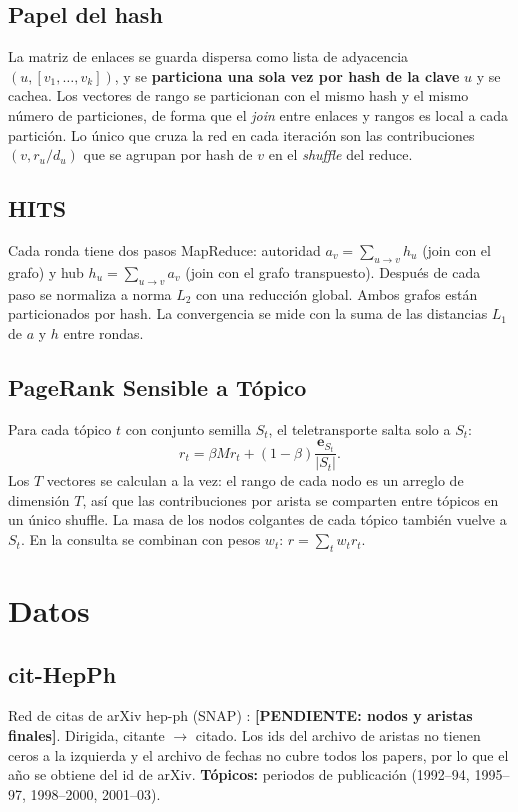\documentclass[11pt,a4paper]{article}
\newcommand{\pend}[1]{\textcolor{red!70!black}{\textbf{[PENDIENTE: #1]}}}
\begin{document}
\subsection{Papel del hash}
La matriz de enlaces se guarda dispersa como lista de adyacencia $(u,[v_1,\dots,v_k])$, y se \textbf{particiona una sola vez por hash de la clave} $u$ y se cachea. Los vectores de rango se particionan con el mismo hash y el mismo número de particiones, de forma que el \emph{join} entre enlaces y rangos es local a cada partición. Lo único que cruza la red en cada iteración son las contribuciones $(v, r_u/d_u)$ que se agrupan por hash de $v$ en el \emph{shuffle} del reduce.

\subsection{HITS}
Cada ronda tiene dos pasos MapReduce: autoridad $a_v=\sum_{u\to v}h_u$ (join con el grafo) y hub $h_u=\sum_{u\to v}a_v$ (join con el grafo transpuesto). Después de cada paso se normaliza a norma $L_2$ con una reducción global. Ambos grafos están particionados por hash. La convergencia se mide con la suma de las distancias $L_1$ de $a$ y $h$ entre rondas.

\subsection{PageRank Sensible a Tópico}
Para cada tópico $t$ con conjunto semilla $S_t$, el teletransporte salta solo a $S_t$:
\begin{equation}
  r_t = \beta M r_t + (1-\beta)\frac{\mathbf{e}_{S_t}}{|S_t|}.
\end{equation}
Los $T$ vectores se calculan a la vez: el rango de cada nodo es un arreglo de dimensión $T$, así que las contribuciones por arista se comparten entre tópicos en un único shuffle. La masa de los nodos colgantes de cada tópico también vuelve a $S_t$. En la consulta se combinan con pesos $w_t$: $r=\sum_t w_t r_t$.

\section{Datos}
\subsection{cit-HepPh}
Red de citas de arXiv hep-ph (SNAP) \cite{leskovec2007graph}: \pend{nodos y aristas finales}. Dirigida, citante $\to$ citado. Los ids del archivo de aristas no tienen ceros a la izquierda y el archivo de fechas no cubre todos los papers, por lo que el año se obtiene del id de arXiv. \textbf{Tópicos:} periodos de publicación (1992--94, 1995--97, 1998--2000, 2001--03).
\end{document}
